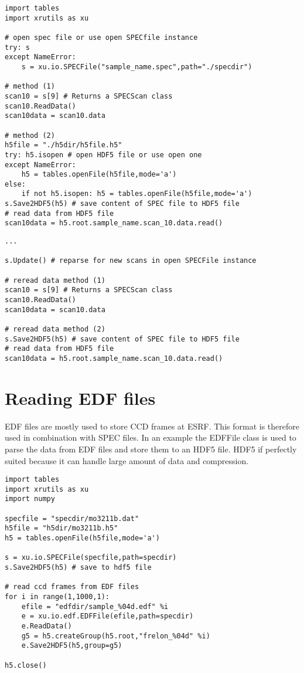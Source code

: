 \begin{lstlisting}[caption=parsing a SPEC file and read data (1) or dumping the data to an HDF5 file (2)]
import tables
import xrutils as xu

# open spec file or use open SPECfile instance
try: s
except NameError:
    s = xu.io.SPECFile("sample_name.spec",path="./specdir")

# method (1)
scan10 = s[9] # Returns a SPECScan class
scan10.ReadData()
scan10data = scan10.data

# method (2)
h5file = "./h5dir/h5file.h5"
try: h5.isopen # open HDF5 file or use open one
except NameError:
    h5 = tables.openFile(h5file,mode='a')
else:
    if not h5.isopen: h5 = tables.openFile(h5file,mode='a')
s.Save2HDF5(h5) # save content of SPEC file to HDF5 file
# read data from HDF5 file
scan10data = h5.root.sample_name.scan_10.data.read()
\end{lstlisting}

\begin{lstlisting}[caption=reparse the SPEC file for new scans and reread the scans (1) or update the HDF5 file(2)]
...

s.Update() # reparse for new scans in open SPECFile instance

# reread data method (1)
scan10 = s[9] # Returns a SPECScan class
scan10.ReadData()
scan10data = scan10.data

# reread data method (2)
s.Save2HDF5(h5) # save content of SPEC file to HDF5 file
# read data from HDF5 file
scan10data = h5.root.sample_name.scan_10.data.read()
\end{lstlisting}

\section{Reading EDF files}

EDF files are mostly used to store CCD frames at ESRF. This format is therefore used in combination with SPEC files. In an example the EDFFile class is used to parse the data from EDF files and store them to an HDF5 file. HDF5 if perfectly suited because it can handle large amount of data and compression.

\begin{lstlisting}[caption=script to parse and plot a reciprocal space map recorded with Seifert's XRD control software]
import tables
import xrutils as xu
import numpy

specfile = "specdir/mo3211b.dat"
h5file = "h5dir/mo3211b.h5"
h5 = tables.openFile(h5file,mode='a')

s = xu.io.SPECFile(specfile,path=specdir)
s.Save2HDF5(h5) # save to hdf5 file

# read ccd frames from EDF files
for i in range(1,1000,1):
    efile = "edfdir/sample_%04d.edf" %i
    e = xu.io.edf.EDFFile(efile,path=specdir)
    e.ReadData()
    g5 = h5.createGroup(h5.root,"frelon_%04d" %i)
    e.Save2HDF5(h5,group=g5)

h5.close()
\end{lstlisting}

